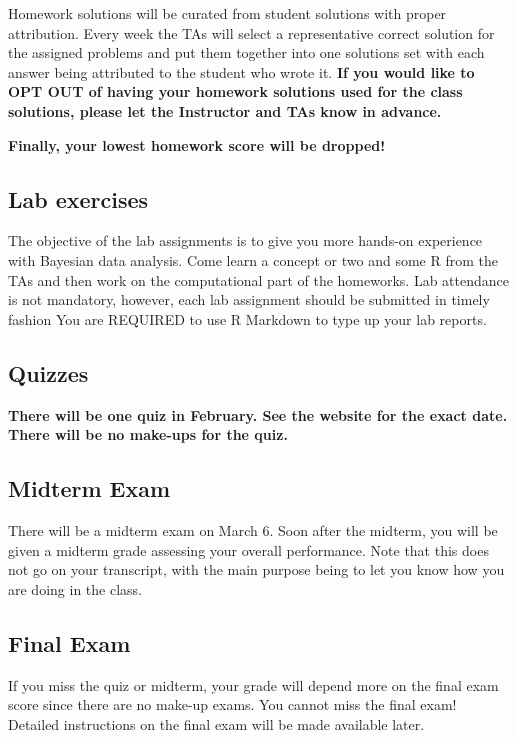 \documentclass[11pt, a4paper]{article}
\begin{document}
Homework solutions will be curated from student solutions with proper attribution. Every week the TAs will select a representative correct solution for the assigned problems and put them together into one solutions set with each answer being attributed to the student who wrote it. \textbf{If you would like to OPT OUT of having your homework solutions used for the class solutions, please let the Instructor and TAs know in advance.}

\textbf{Finally, your lowest homework score will be dropped!}

\subsection{Lab exercises}
The objective of the lab assignments is to give you more hands-on experience with Bayesian data analysis. Come learn a concept or two and some R from the TAs and then work on the computational part of the homeworks. Lab attendance is not mandatory, however, each lab assignment should be submitted in timely fashion You are REQUIRED to use R Markdown to type up your lab reports.

\subsection{Quizzes}
{\color{darkred} \textbf{There will be one quiz in February. See the website for the exact date. There will be no make-ups for the quiz.}}


\subsection{Midterm Exam}
There will be a midterm exam on March 6.  Soon after the midterm, you will be given a midterm grade assessing your overall performance. Note that this does not go on your transcript, with the main purpose being to let you know how you are doing in the class.

\subsection{Final Exam}
If you miss the quiz or midterm, your grade will depend more on the final exam score since there are no make-up exams. You cannot miss the final exam! Detailed instructions on the final exam will be made available later.
\end{document}
